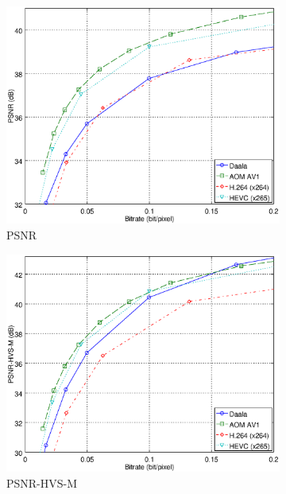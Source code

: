 \documentclass[english,conference,10pt]{IEEEtran}
\begin{document}
\begin{figure}
\centering
\begin{subfigure}[t]{0.44\textwidth}
\includegraphics[width=\columnwidth]{psnr.eps}
\caption{PSNR}
\end{subfigure}\hspace{0.12\columnwidth}\begin{subfigure}[t]{0.44\textwidth}
\includegraphics[width=\columnwidth]{psnrhvsm.eps}
\caption{PSNR-HVS-M}\label{fig:psnrhvsm}
\end{subfigure}
\begin{subfigure}[t]{0.44\textwidth}

\end{subfigure}
\end{figure}
\end{document}
